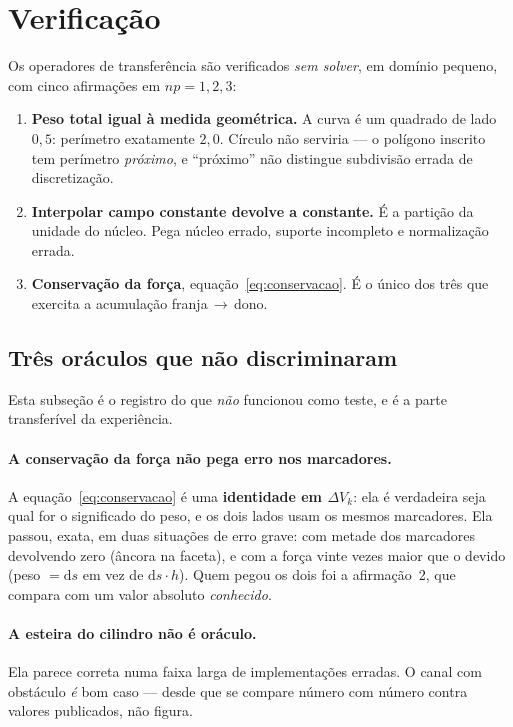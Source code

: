 \section{Verificação}
\label{sec:verificacao}

Os operadores de transferência são verificados \emph{sem solver}, em domínio
pequeno, com cinco afirmações em $np = 1, 2, 3$:

\begin{enumerate}
  \item \textbf{Peso total igual à medida geométrica.} A curva é um quadrado de
        lado $0{,}5$: perímetro exatamente $2{,}0$. Círculo não serviria --- o
        polígono inscrito tem perímetro \emph{próximo}, e ``próximo'' não
        distingue subdivisão errada de discretização.
  \item \textbf{Interpolar campo constante devolve a constante.} É a partição da
        unidade do núcleo. Pega núcleo errado, suporte incompleto e normalização
        errada.
  \item \textbf{Conservação da força}, equação~\eqref{eq:conservacao}. É o único
        dos três que exercita a acumulação franja\,$\to$\,dono.
\end{enumerate}

\subsection{Três oráculos que não discriminaram}

Esta subseção é o registro do que \emph{não} funcionou como teste, e é a parte
transferível da experiência.

\paragraph{A conservação da força não pega erro nos marcadores.} A
equação~\eqref{eq:conservacao} é uma \textbf{identidade em $\Delta V_k$}: ela é
verdadeira seja qual for o significado do peso, e os dois lados usam os mesmos
marcadores. Ela passou, exata, em duas situações de erro grave: com metade dos
marcadores devolvendo zero (âncora na faceta), e com a força vinte vezes maior
que o devido (peso $=\mathrm{d}s$ em vez de $\mathrm{d}s\cdot h$). Quem pegou os
dois foi a afirmação~2, que compara com um valor absoluto \emph{conhecido}.

\paragraph{A esteira do cilindro não é oráculo.} Ela parece correta numa faixa
larga de implementações erradas. O canal com obstáculo \emph{é} bom caso ---
desde que se compare número com número contra valores publicados, não figura.


